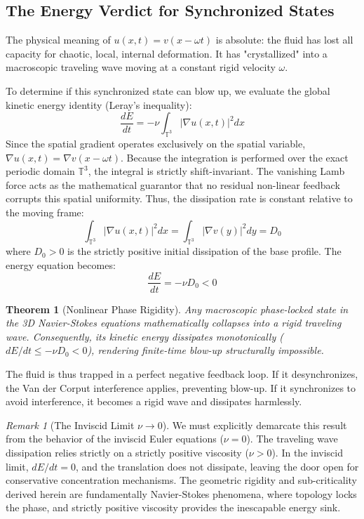 \documentclass[12pt,a4paper]{article}
\theoremstyle{plain}
\newtheorem{theorem}{Theorem}[section]
\theoremstyle{definition}
\theoremstyle{remark}
\newtheorem{remark}{Remark}[section]
\begin{document}
\subsection{The Energy Verdict for Synchronized States}
The physical meaning of $u(x,t) = v(x - \omega t)$ is absolute: the fluid has lost all capacity for chaotic, local, internal deformation. It has "crystallized" into a macroscopic traveling wave moving at a constant rigid velocity $\omega$. 

To determine if this synchronized state can blow up, we evaluate the global kinetic energy identity (Leray's inequality):
\begin{equation}
    \frac{dE}{dt} = - \nu \int_{\mathbb{T}^3} |\nabla u(x,t)|^2 dx
\end{equation}
Since the spatial gradient operates exclusively on the spatial variable, $\nabla u(x,t) = \nabla v(x - \omega t)$. Because the integration is performed over the exact periodic domain $\mathbb{T}^3$, the integral is strictly shift-invariant. The vanishing Lamb force acts as the mathematical guarantor that no residual non-linear feedback corrupts this spatial uniformity. Thus, the dissipation rate is constant relative to the moving frame:
\begin{equation}
    \int_{\mathbb{T}^3} |\nabla u(x,t)|^2 dx = \int_{\mathbb{T}^3} |\nabla v(y)|^2 dy = D_0
\end{equation}
where $D_0 > 0$ is the strictly positive initial dissipation of the base profile. The energy equation becomes:
\begin{equation}
    \frac{dE}{dt} = - \nu D_0 < 0
\end{equation}
\begin{theorem}[Nonlinear Phase Rigidity]\label{thm:phase_rigidity}
Any macroscopic phase-locked state in the 3D Navier-Stokes equations mathematically collapses into a rigid traveling wave. Consequently, its kinetic energy dissipates monotonically ($dE/dt \leq -\nu D_0 < 0$), rendering finite-time blow-up structurally impossible.
\end{theorem}
The fluid is thus trapped in a perfect negative feedback loop. If it desynchronizes, the Van der Corput interference applies, preventing blow-up. If it synchronizes to avoid interference, it becomes a rigid wave and dissipates harmlessly.

\begin{remark}[The Inviscid Limit $\nu \to 0$]
We must explicitly demarcate this result from the behavior of the inviscid Euler equations ($\nu = 0$). The traveling wave dissipation relies strictly on a strictly positive viscosity ($\nu > 0$). In the inviscid limit, $dE/dt = 0$, and the translation does not dissipate, leaving the door open for conservative concentration mechanisms. The geometric rigidity and sub-criticality derived herein are fundamentally Navier-Stokes phenomena, where topology locks the phase, and strictly positive viscosity provides the inescapable energy sink.
\end{remark}
\end{document}
